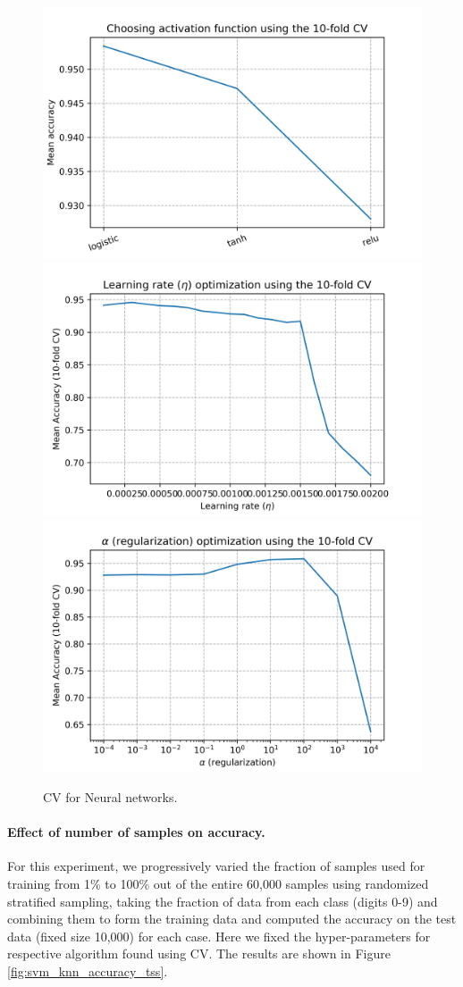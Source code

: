 \documentclass[10pt]{scrartcl}
\begin{document}
\begin{figure}
\centering
\includegraphics[width=0.33\linewidth]{figures/Neural_net_act_fcn_mean_acc.png}%
\includegraphics[width=0.33\linewidth]{figures/Neural_net_learn_rate_mean_acc.png}%
\includegraphics[width=0.33\linewidth]{figures/Neural_net_alpha_mean_acc.png}
\caption{CV for Neural networks. \label{fig:nn_cv}}
\end{figure}

\paragraph{Effect of number of samples on accuracy.}
For this experiment,  we progressively varied the fraction of samples used for training from 1\% to 100\% out of the entire 60,000 samples using randomized stratified sampling, taking the fraction of data from each class (digits 0-9) and combining them to form the training data and computed the accuracy on the test data (fixed size 10,000) for each case. Here we fixed the hyper-parameters for respective algorithm found using CV. The results are shown in Figure \ref{fig:svm_knn_accuracy_tss}.
\end{document}
